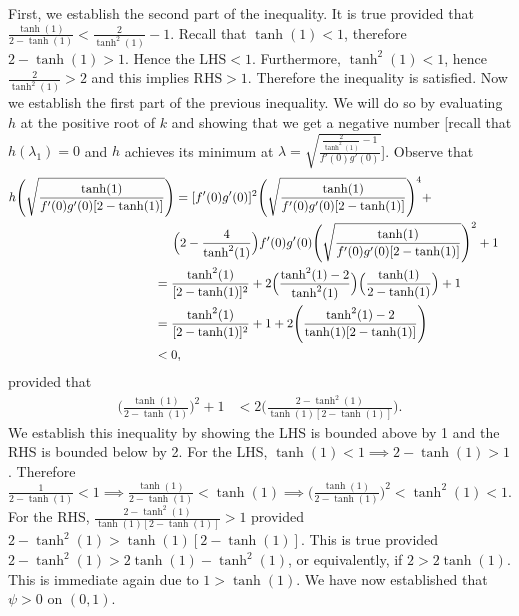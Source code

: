 \documentclass[12pt, reqno]{amsart}
\numberwithin{equation}{section}
\begin{document}
First, we establish the second part of the inequality. It is true provided that
$\frac{\tanh(1)}{2-\tanh(1)} < \frac{2}{\tanh^2(1)} - 1$. Recall that $\tanh(1) < 1$, therefore $2 - \tanh(1) > 1$. Hence the $\text{LHS} < 1$. Furthermore, $\tanh^2(1) < 1$, hence $\frac{2}{\tanh^2(1)} > 2$ and this implies $\text{RHS} > 1$. Therefore the inequality is satisfied. Now we establish the first part of the previous inequality. We will do so by evaluating $h$ at the positive root of $k$ and showing that we get a negative number [recall that $h(\lambda_1) = 0$ and $h$ achieves its minimum at $\lambda = \sqrt{\frac{\frac{2}{\tanh^2(1)}-1}{f'(0)g'(0)}}$]. Observe that
\small
\begin{align*}
    h \Bigg( \sqrt{\frac{\tanh(1)}{f'(0)g'(0)[2-\tanh(1)]}}\Bigg)
    = [f'(0)g'(0)]^2 \Bigg( \sqrt{\frac{\tanh(1)}{f'(0)g'(0)[2-\tanh(1)]}} \Bigg)^4 + \\
    &\hspace{-2.85in} 
        \Big( 2 - \frac{4}{\tanh^2(1)} \Big) f'(0)g'(0) \Bigg( \sqrt{\frac{\tanh(1)}{f'(0)g'(0)[2-\tanh(1)]}} \Bigg)^2 + 1 \\
    &\hspace{-3.05in} =
        \frac{\tanh^2(1)}{[2-\tanh(1)]^2} +
        2 \Big( \frac{\tanh^2(1)-2}{\tanh^2(1)} \Big) \Big( \frac{\tanh(1)}{2-\tanh(1)} \Big) + 1 \\
    &\hspace{-3.05in} =
         \frac{\tanh^2(1)}{[2-\tanh(1)]^2} + 1
         + 2 \Bigg( \frac{\tanh^2(1)-2}{\tanh(1)[2-\tanh(1)]} \Bigg) \\
    &\hspace{-3.05in} < 0,
\end{align*}
provided that
\begin{align*}
    \Big( \frac{\tanh(1)}{2-\tanh(1)} \Big)^2 + 1
    &< 2 \Bigg( \frac{2-\tanh^2(1)}
         {\tanh(1)[2-\tanh(1)]} \Bigg).
\end{align*}
We establish this inequality by showing the LHS is bounded above by 1 and the RHS is bounded below by 2. For the LHS, $\tanh(1) < 1 \implies 2-\tanh(1) > 1$. Therefore $\frac{1}{2-\tanh(1)} < 1 \implies \frac{\tanh(1)}{2-\tanh(1)} < \tanh(1) \implies \Big( \frac{\tanh(1)}{2-\tanh(1)} \Big)^2 < \tanh^2(1) < 1$. For the RHS, $\frac{2-\tanh^2(1)}{\tanh(1)[2-\tanh(1)]} > 1$ provided $2 - \tanh^2(1) > \tanh(1)[2 - \tanh(1)]$. This is true provided $2 - \tanh^2(1) > 2\tanh(1) - \tanh^2(1)$, or equivalently, if $2 > 2\tanh(1)$. This is immediate again due to $1 > \tanh(1)$. We have now established that $\psi > 0$ on $(0,1)$.
\end{document}
